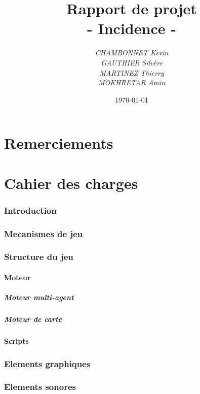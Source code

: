 \documentclass[a4paper]{article}
\title{\textbf{Rapport de projet}\\- \Huge{Incidence} -}
\author{\emph{CHAMBONNET Kevin}\\\emph{GAUTHIER Silvère}\\\emph{MARTINEZ Thierry}\\\emph{MOKHRETAR Amin}}
\date{\today}
\begin{document}
  \maketitle
  \newpage
  \tableofcontents

  \newpage
  \part{Remerciements}

  \newpage
  \part{Cahier des charges}
  
	\section{Introduction}
	
	\section{Mecanismes de jeu}
	
	\section{Structure du jeu}
	
		\subsection{Moteur}
		
			\subsubsection{Moteur multi-agent}
			
			\subsubsection{Moteur de carte}
			
		\subsection{Scripts}
		
	\section{Elements graphiques}
	
	\section{Elements sonores}
	
\end{document}
